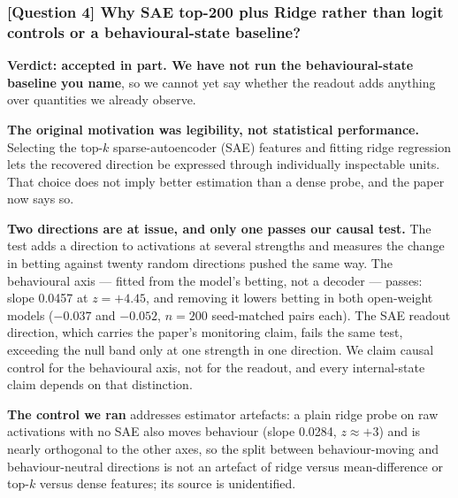 
\subsubsection*{\textbf{[Question 4]} Why SAE top-200 plus Ridge rather than logit controls or a behavioural-state baseline?}

\textbf{Verdict: accepted in part. We have not run the behavioural-state baseline you name}, so
we cannot yet say whether the readout adds anything over quantities we already observe.

\vspace{0.3em}
\noindent\textbf{The original motivation was legibility, not statistical performance.} Selecting
the top-$k$ sparse-autoencoder (SAE) features and fitting ridge regression lets the recovered
direction be expressed through individually inspectable units. That choice does not imply better
estimation than a dense probe, and the paper now says so.

\vspace{0.3em}
\noindent\textbf{Two directions are at issue, and only one passes our causal test.} The test
adds a direction to activations at several strengths and measures the change in betting against
twenty random directions pushed the same way. The behavioural axis --- fitted from the model's
betting, not a decoder --- passes: slope 0.0457 at $z = +4.45$, and removing it lowers betting
in both open-weight models ($-0.037$ and $-0.052$, $n = 200$ seed-matched pairs each). The SAE
readout direction, which carries the paper's monitoring claim, fails the same test, exceeding
the null band only at one strength in one direction. We claim causal control for the
behavioural axis, not for the readout, and every internal-state claim depends on that
distinction.

\vspace{0.3em}
\noindent\textbf{The control we ran} addresses estimator artefacts: a plain ridge probe on raw
activations with no SAE also moves behaviour (slope 0.0284, $z \approx +3$) and is nearly
orthogonal to the other axes, so the split between behaviour-moving and behaviour-neutral
directions is not an artefact of ridge versus mean-difference or top-$k$ versus dense features;
its source is unidentified.

